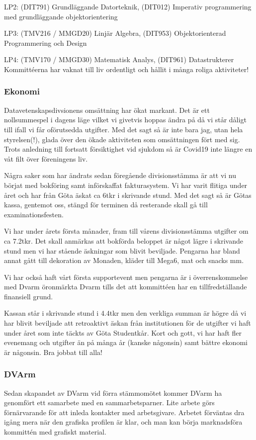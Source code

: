 \documentclass[protokoll]{dvd}
\begin{document}
LP2: (DIT791) Grundläggande Datorteknik, (DIT012) Imperativ programmering med grundläggande objektorientering

LP3: (TMV216 / MMGD20) Linjär Algebra, (DIT953) Objektorienterad Programmering och Design

LP4: (TMV170 / MMGD30) Matematisk Analys, (DIT961) Datastrukterer \\

Kommittéerna har vaknat till liv ordentligt och hållit i många roliga aktiviteter!

\subsubsection*{Ekonomi}

Datavetenskapsdivsionens omsättning har ökat markant. Det är ett nollsummespel i dagens läge vilket vi givetvis hoppas ändra på då vi står dåligt till ifall vi får oförutsedda utgifter. Med det sagt så är inte bara jag, utan hela styrelsen(!), glada över den ökade aktiviteten som omsättningen fört med sig. Trots anledning till fortsatt försiktighet vid sjukdom så är Covid19 inte längre en våt filt över föreningens liv.

Några saker som har ändrats sedan föregående divisionsstämma är att vi nu börjat med bokföring samt införskaffat fakturasystem. Vi har varit flitiga under året och har från Göta äskat ca 6tkr i skrivande stund. Med det sagt så är Götas kassa, gentemot oss, stängd för terminen då resterande skall gå till examinationsfesten.


Vi har under årets första månader, fram till vårens divisionsstämma utgifter om ca 7.2tkr. Det skall anmärkas att bokförda beloppet är något lägre i skrivande stund men vi har stående äskningar som blivit beviljade. Pengarna har bland annat gått till dekoration av Monaden, kläder till Mega6, mat och snacks mm.

Vi har också haft vårt första supportevent men pengarna är i överrenskommelse med Dvarm öronmärkta Dvarm tills det att kommittéen har en tillfredställande finansiell grund.

Kassan står i skrivande stund i 4.4tkr men den verkliga summan är högre då vi har blivit beviljade att retroaktivt äskan från institutionen för de utgifter vi haft under året som inte täckts av Göta Studentkår. Kort och gott, vi har haft fler evenemang och utgifter än på många år (kanske någonsin) samt bättre ekonomi är någonsin. Bra jobbat till alla!


\subsubsection*{DVArm}
Sedan skapandet av DVarm vid förra stämmomötet kommer DVarm ha genomfört ett samarbete med en sammarbetsparner.
Lite arbete görs förnärvarande för att inleda kontakter med arbetsgivare. Arbetet förväntas dra igång mera när den grafiska profilen är klar, och man kan börja marknadsföra kommittén med grafiskt material.
\end{document}
